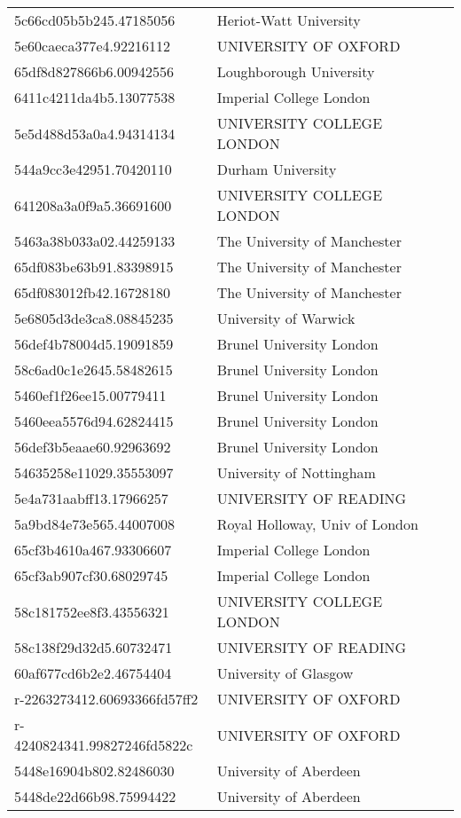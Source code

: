 \begin{tabular}{ll}
5c66cd05b5b245.47185056 & Heriot-Watt University \\
5e60caeca377e4.92216112 & UNIVERSITY OF OXFORD \\
65df8d827866b6.00942556 & Loughborough University \\
6411c4211da4b5.13077538 & Imperial College London \\
5e5d488d53a0a4.94314134 & UNIVERSITY COLLEGE LONDON \\
544a9cc3e42951.70420110 & Durham University \\
641208a3a0f9a5.36691600 & UNIVERSITY COLLEGE LONDON \\
5463a38b033a02.44259133 & The University of Manchester \\
65df083be63b91.83398915 & The University of Manchester \\
65df083012fb42.16728180 & The University of Manchester \\
5e6805d3de3ca8.08845235 & University of Warwick \\
56def4b78004d5.19091859 & Brunel University London \\
58c6ad0c1e2645.58482615 & Brunel University London \\
5460ef1f26ee15.00779411 & Brunel University London \\
5460eea5576d94.62824415 & Brunel University London \\
56def3b5eaae60.92963692 & Brunel University London \\
54635258e11029.35553097 & University of Nottingham \\
5e4a731aabff13.17966257 & UNIVERSITY OF READING \\
5a9bd84e73e565.44007008 & Royal Holloway, Univ of London \\
65cf3b4610a467.93306607 & Imperial College London \\
65cf3ab907cf30.68029745 & Imperial College London \\
58c181752ee8f3.43556321 & UNIVERSITY COLLEGE LONDON \\
58c138f29d32d5.60732471 & UNIVERSITY OF READING \\
60af677cd6b2e2.46754404 & University of Glasgow \\
r-2263273412.60693366fd57ff2 & UNIVERSITY OF OXFORD \\
r-4240824341.99827246fd5822c & UNIVERSITY OF OXFORD \\
5448e16904b802.82486030 & University of Aberdeen \\
5448de22d66b98.75994422 & University of Aberdeen \\

\end{tabular}
